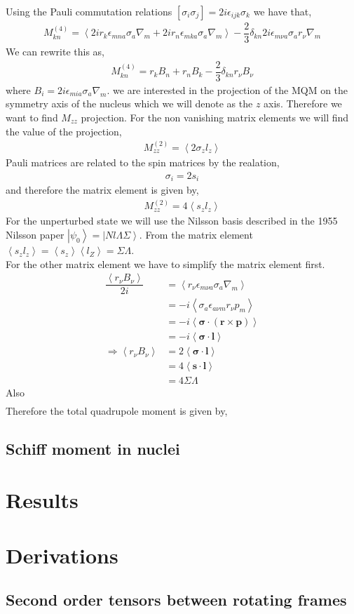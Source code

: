 \documentclass[10pt,a4paper]{report}
\begin{document}
Using the Pauli commutation relations $\left[\sigma_i\sigma_j\right] = 2i\epsilon_{ijk}\sigma_k$ we have that,
\begin{align*}
M^{(4)}_{kn} = \left<2ir_k\epsilon_{mna}\sigma_a\nabla_m + 2ir_n\epsilon_{mka}\sigma_a\nabla_m\right> - \dfrac{2}{3}\delta_{kn}2i\epsilon_{m\nu a}\sigma_{a}r_{\nu}\nabla_{m}
\end{align*}
We can rewrite this as,
\begin{align*}
M^{(4)}_{kn} = r_kB_n + r_nB_k - \dfrac{2}{3}\delta_{kn}r_{\nu}B_{\nu}
\end{align*}
where $B_{i} = 2i\epsilon_{mia}\sigma_a\nabla_m$. we are interested in the projection of the MQM on the symmetry axis of the nucleus which we will denote as the $z$ axis. Therefore we want to find $M_{zz}$ projection. For the non vanishing matrix elements we will find the value of the projection,
\begin{align*}
M_{zz}^{(2)} = \left<2\sigma_zl_z\right>
\end{align*}
Pauli matrices are related to the spin matrices by the realation,
\begin{align*}
\sigma_i = 2s_i
\end{align*}
and therefore the matrix element is given by,
\begin{align*}
M_{zz}^{(2)} = 4\left<s_zl_z\right>
\end{align*}
For the unperturbed state we will use the Nilsson basis described in the 1955 Nilsson paper \cite{Nilsson1955} $\left|\psi_0\right> = \left|Nl\Lambda\Sigma\right>$. From \cite{Nilsson1955} the matrix element $\left<s_zl_z\right> = \left<s_z\right>\left<l_Z\right> = \Sigma\Lambda$. \\
For the other matrix element we have to simplify the matrix element first. \\

\begin{align*}
\dfrac{\left<r_{\nu}B_{\nu}\right>}{2i} &= \left<r_{\nu}\epsilon_{m\nu a}\sigma_a \nabla_m\right> \\
&= -i\left<\sigma_a\epsilon_{a\nu m}r_{\nu} p_{m} \right> \\
&= -i\left<\boldsymbol{\sigma}\cdot\left(\textbf{r} \times \textbf{p}\right)\right> \\
&= -i\left<\boldsymbol{\sigma}\cdot\textbf{l}\right> \\ 
\Rightarrow \left<r_{\nu}B_{\nu}\right> &= 2\left<\boldsymbol{\sigma}\cdot\textbf{l}\right> \\
&= 4\left<\textbf{s}\cdot\textbf{l}\right> \\
&= 4\Sigma\Lambda
\end{align*}
Also
\begin{align*}
\end{align*}
Therefore the total quadrupole moment is given by,
\section{Schiff moment in nuclei}
\chapter{Results}
\appendix
\chapter{Derivations}
\section{Second order tensors between rotating frames}
\end{document}
